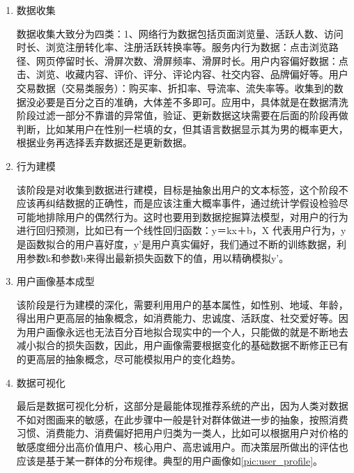 	    \begin{enumerate}[(1)]
	    \item 数据收集

	    数据收集大致分为四类：1、网络行为数据包括页面浏览量、活跃人数、访问时长、浏览注册转化率、注册活跃转换率等。服务内行为数据：点击浏览路径、网页停留时长、滑屏次数、滑屏频率、滑屏时长。用户内容偏好数据：点击、浏览、收藏内容、评价、评分、评论内容、社交内容、品牌偏好等。用户交易数据（交易类服务）：购买率、折扣率、导流率、流失率等。收集到的数据没必要是百分之百的准确，大体差不多即可。应用中，具体就是在数据清洗阶段过滤一部分不靠谱的异常值，验证、更新数据这块需要在后面的阶段再做判断，比如某用户在性别一栏填的女，但其语言数据显示其为男的概率更大，根据业务再选择丢弃数据还是更新数据。
	    
	    \item 行为建模

	    该阶段是对收集到数据进行建模，目标是抽象出用户的文本标签，这个阶段不应该再纠结数据的正确性，而是应该注重大概率事件，通过统计学假设检验尽可能地排除用户的偶然行为。这时也要用到数据挖掘算法模型，对用户的行为进行回归预测，比如已有一个线性回归函数：y＝kx＋b，X 代表用户行为，y是函数拟合的用户喜好度，y'是用户真实偏好，我们通过不断的训练数据，利用参数k和参数b来得出最新损失函数下的值，用以精确模拟y'。

	    \item 用户画像基本成型

	    该阶段是行为建模的深化，需要利用用户的基本属性，如性别、地域、年龄，得出用户更高层的抽象概念，如消费能力、忠诚度、活跃度、社交爱好等。因为用户画像永远也无法百分百地拟合现实中的一个人，只能做的就是不断地去减小拟合的损失函数，因此，用户画像需要根据变化的基础数据不断修正已有的更高层的抽象概念，尽可能模拟用户的变化趋势。

	    \item 数据可视化

	    最后是数据可视化分析，这部分是最能体现推荐系统的产出，因为人类对数据不如对图画来的敏感，在此步骤中一般是针对群体做进一步的抽象，按照消费习惯、消费能力、消费偏好把用户归类为一类人，比如可以根据用户对价格的敏感度细分出高价值用户、核心用户、高忠诚用户。而决策层所做出的评估也应该是基于某一群体的分布规律。典型的用户画像如\autoref{pic:user_profile}。
	    \end{enumerate}
